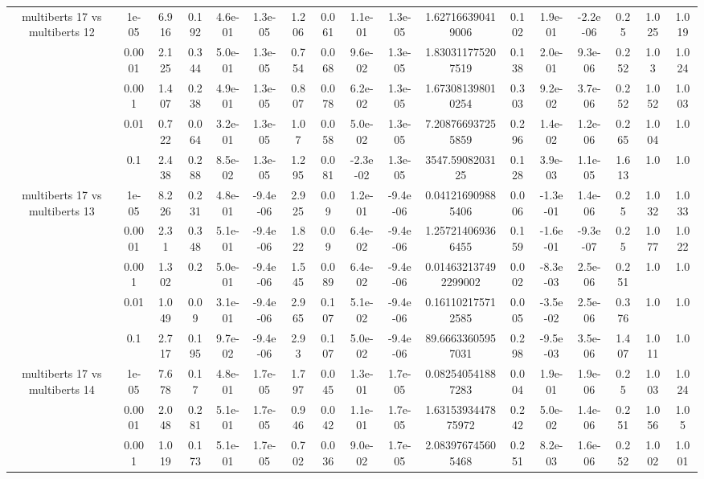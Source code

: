 \begin{tabular}{|c|c|c|c|c|c|c|c|c|c|c|c|c|c|c|c|c|}
\hline
\multirow{5}{*}{multiberts 17 vs multiberts 12} & 1e-05 & 6.916 & 0.192 & 4.6e-01 & 1.3e-05 & 1.206 & 0.061 & 1.1e-01 & 1.3e-05 & 1.627166390419006 & 0.102 & 1.9e-01 & -2.2e-06 & 0.25 & 1.025 & 1.019 \\
 & 0.0001 & 2.125 & 0.344 & 5.0e-01 & 1.3e-05 & 0.754 & 0.068 & 9.6e-02 & 1.3e-05 & 1.830311775207519 & 0.138 & 2.0e-01 & 9.3e-06 & 0.252 & 1.03 & 1.024 \\
 & 0.001 & 1.407 & 0.238 & 4.9e-01 & 1.3e-05 & 0.807 & 0.078 & 6.2e-02 & 1.3e-05 & 1.673081398010254 & 0.303 & 9.2e-02 & 3.7e-06 & 0.252 & 1.052 & 1.003 \\
 & 0.01 & 0.722 & 0.064 & 3.2e-01 & 1.3e-05 & 1.07 & 0.058 & 5.0e-02 & 1.3e-05 & 7.208766937255859 & 0.296 & 1.4e-02 & 1.2e-06 & 0.265 & 1.004 & 1.0 \\
 & 0.1 & 2.438 & 0.288 & 8.5e-02 & 1.3e-05 & 1.295 & 0.081 & -2.3e-02 & 1.3e-05 & 3547.5908203125 & 0.128 & 3.9e-03 & 1.1e-05 & 1.613 & 1.0 & 1.0 \\
\hline
\multirow{5}{*}{multiberts 17 vs multiberts 13} & 1e-05 & 8.226 & 0.231 & 4.8e-01 & -9.4e-06 & 2.925 & 0.09 & 1.2e-01 & -9.4e-06 & 0.041216909885406 & 0.006 & -1.3e-01 & 1.4e-06 & 0.25 & 1.032 & 1.033 \\
 & 0.0001 & 2.31 & 0.348 & 5.1e-01 & -9.4e-06 & 1.822 & 0.09 & 6.4e-02 & -9.4e-06 & 1.257214069366455 & 0.159 & -1.6e-01 & -9.3e-07 & 0.25 & 1.077 & 1.022 \\
 & 0.001 & 1.302 & 0.2 & 5.0e-01 & -9.4e-06 & 1.545 & 0.089 & 6.4e-02 & -9.4e-06 & 0.014632137492299002 & 0.002 & -8.3e-03 & 2.5e-06 & 0.251 & 1.0 & 1.0 \\
 & 0.01 & 1.049 & 0.09 & 3.1e-01 & -9.4e-06 & 2.965 & 0.107 & 5.1e-02 & -9.4e-06 & 0.161102175712585 & 0.005 & -3.5e-02 & 2.5e-06 & 0.376 & 1.0 & 1.0 \\
 & 0.1 & 2.717 & 0.195 & 9.7e-02 & -9.4e-06 & 2.93 & 0.107 & 5.0e-02 & -9.4e-06 & 89.66633605957031 & 0.298 & -9.5e-03 & 3.5e-06 & 1.407 & 1.011 & 1.0 \\
\hline
\multirow{5}{*}{multiberts 17 vs multiberts 14} & 1e-05 & 7.678 & 0.17 & 4.8e-01 & 1.7e-05 & 1.797 & 0.045 & 1.3e-01 & 1.7e-05 & 0.082540541887283 & 0.004 & 1.9e-01 & 1.9e-06 & 0.25 & 1.003 & 1.024 \\
 & 0.0001 & 2.048 & 0.281 & 5.1e-01 & 1.7e-05 & 0.946 & 0.042 & 1.1e-01 & 1.7e-05 & 1.6315393447875972 & 0.242 & 5.0e-02 & 1.4e-06 & 0.251 & 1.056 & 1.05 \\
 & 0.001 & 1.019 & 0.173 & 5.1e-01 & 1.7e-05 & 0.702 & 0.036 & 9.0e-02 & 1.7e-05 & 2.083976745605468 & 0.251 & 8.2e-03 & 1.6e-06 & 0.252 & 1.002 & 1.001 \\

\end{tabular}
